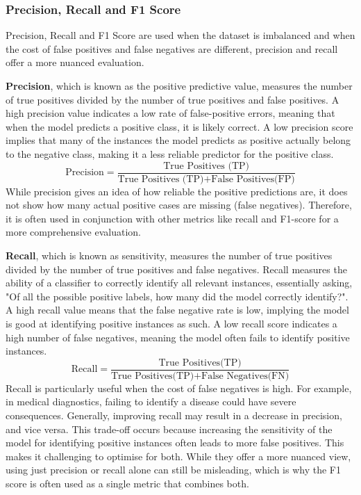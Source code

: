 \subsubsection{Precision, Recall and F1 Score}

Precision, Recall and F1 Score are used when the dataset is imbalanced and when the cost of false positives and false negatives are different, precision and recall offer a more nuanced evaluation. 

\textbf{Precision}, which is known as the positive predictive value, measures the number of true positives divided by the number of true positives and false positives. A high precision value indicates a low rate of false-positive errors, meaning that when the model predicts a positive class, it is likely correct. A low precision score implies that many of the instances the model predicts as positive actually belong to the negative class, making it a less reliable predictor for the positive class.
\begin{equation*}
\text{Precision} = \frac{\text{True Positives (TP)}}{\text{True Positives (TP)} + \text{False Positives(FP)}} 
\end{equation*}
While precision gives an idea of how reliable the positive predictions are, it does not show how many actual positive cases are missing (false negatives). Therefore, it is often used in conjunction with other metrics like recall and F1-score for a more comprehensive evaluation.

\textbf{Recall}, which is known as sensitivity, measures the number of true positives divided by the number of true positives and false negatives. Recall measures the ability of a classifier to correctly identify all relevant instances, essentially asking, "Of all the possible positive labels, how many did the model correctly identify?". A high recall value means that the false negative rate is low, implying the model is good at identifying positive instances as such. A low recall score indicates a high number of false negatives, meaning the model often fails to identify positive instances.
\begin{equation*}
\text{Recall} = \frac{\text{True Positives(TP)}}{\text{True Positives(TP)} + \text{False Negatives(FN)}} 
\end{equation*}
Recall is particularly useful when the cost of false negatives is high. For example, in medical diagnostics, failing to identify a disease could have severe consequences. Generally, improving recall may result in a decrease in precision, and vice versa. This trade-off occurs because increasing the sensitivity of the model for identifying positive instances often leads to more false positives. This makes it challenging to optimise for both. While they offer a more nuanced view, using just precision or recall alone can still be misleading, which is why the F1 score is often used as a single metric that combines both.


